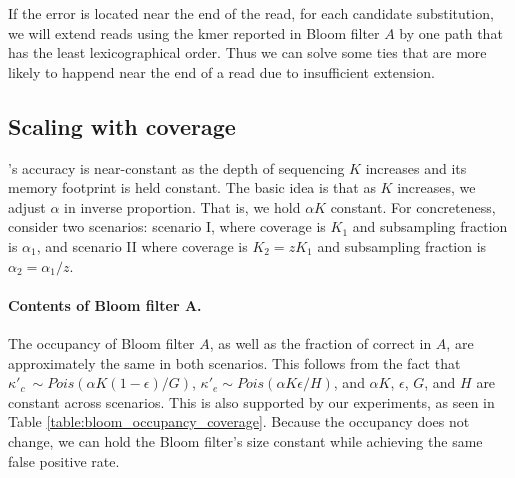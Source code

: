 \documentclass[10pt]{article}
\begin{document}
If the error is located near the end of the read, for each candidate substitution, we will extend reads using the kmer reported in Bloom filter $A$ by one path that has the least lexicographical order. Thus we can solve some ties that are more likely to happend near the end of a read due to insufficient extension. 

\subsection*{Scaling with coverage}
\tool's accuracy is near-constant as the depth of sequencing $K$ increases and its memory footprint is held constant.  The basic idea is that as $K$ increases, we adjust $\alpha$ in inverse proportion.  That is, we hold $\alpha K$ constant.  For concreteness, consider two scenarios: scenario I, where coverage is $K_1$ and subsampling fraction is $\alpha_1$, and scenario II where coverage is $K_2=z K_1$ and subsampling fraction is $\alpha_2 = \alpha_1 / z$.

\paragraph{Contents of Bloom filter A.} The occupancy of Bloom filter $A$, as well as the fraction of correct \kmers in $A$, are approximately the same in both scenarios.  This follows from the fact that $\kappa'_c ~ \sim Pois(\alpha K (1 - \epsilon) / G)$, $\kappa'_e \sim Pois(\alpha K \epsilon / H)$, and $\alpha K$, $\epsilon$, $G$, and $H$ are constant across scenarios.  This is also supported by our experiments, as seen in Table \ref{table:bloom_occupancy_coverage}.  Because the occupancy does not change, we can hold the Bloom filter's size constant while achieving the same false positive rate.

\end{document}
